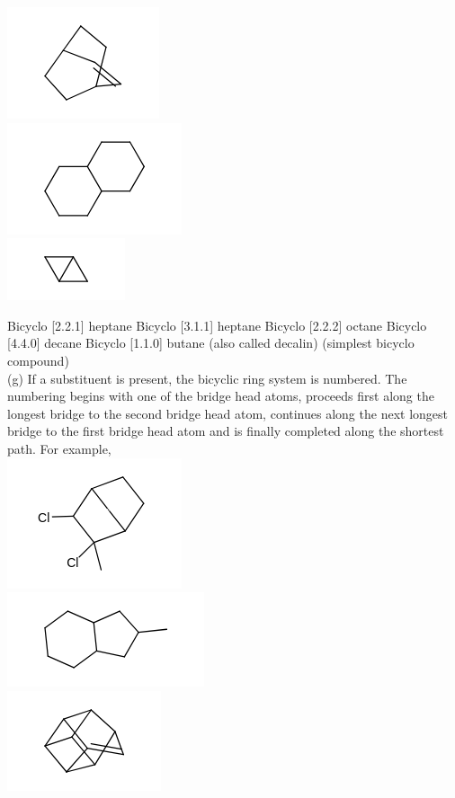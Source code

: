 \documentclass[10pt]{article}
\begin{document}
\includegraphics{smile-ba82c0348c4b8a08e4affa8465c4e0c50e6e5bd5}\\
\includegraphics{smile-679f2af97636ad3b36ee500018745754fedab4c5}\\
\includegraphics{smile-7cf9782d9bb874bada6e7e529f16c2454126c76c}

Bicyclo [2.2.1] heptane Bicyclo [3.1.1] heptane Bicyclo [2.2.2] octane Bicyclo [4.4.0] decane Bicyclo [1.1.0] butane (also called decalin) (simplest bicyclo compound)\\
(g) If a substituent is present, the bicyclic ring system is numbered. The numbering begins with one of the bridge head atoms, proceeds first along the longest bridge to the second bridge head atom, continues along the next longest bridge to the first bridge head atom and is finally completed along the shortest path. For example,\\
\includegraphics{smile-0e22d6295c21b4ceb304d613334b856248464d75}\\
\includegraphics{smile-2269694e28552da32db62f1cd2c4ab41d57067bc}\\
\includegraphics{smile-88580e38fe66e3d8447ec4e7c1d836d79b23f476}
\end{document}
